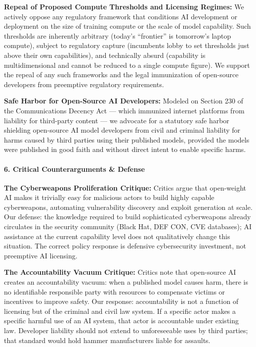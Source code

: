 \textbf{Repeal of Proposed Compute Thresholds and Licensing Regimes:} We
actively oppose any regulatory framework that conditions AI development
or deployment on the size of training compute or the scale of model
capability. Such thresholds are inherently arbitrary (today's
``frontier'' is tomorrow's laptop compute), subject to regulatory
capture (incumbents lobby to set thresholds just above their own
capabilities), and technically absurd (capability is multidimensional
and cannot be reduced to a single compute figure). We support the repeal
of any such frameworks and the legal immunization of open-source
developers from preemptive regulatory requirements.

\textbf{Safe Harbor for Open-Source AI Developers:} Modeled on Section
230 of the Communications Decency Act --- which immunized internet
platforms from liability for third-party content --- we advocate for a
statutory safe harbor shielding open-source AI model developers from
civil and criminal liability for harms caused by third parties using
their published models, provided the models were published in good faith
and without direct intent to enable specific harms.

\paragraph{6. Critical Counterarguments \&
Defense}\label{critical-counterarguments-defense-12}

\textbf{The Cyberweapons Proliferation Critique:} Critics argue that
open-weight AI makes it trivially easy for malicious actors to build
highly capable cyberweapons, automating vulnerability discovery and
exploit generation at scale. Our defense: the knowledge required to
build sophisticated cyberweapons already circulates in the security
community (Black Hat, DEF CON, CVE databases); AI assistance at the
current capability level does not qualitatively change this situation.
The correct policy response is defensive cybersecurity investment, not
preemptive AI licensing.

\textbf{The Accountability Vacuum Critique:} Critics note that
open-source AI creates an accountability vacuum: when a published model
causes harm, there is no identifiable responsible party with resources
to compensate victims or incentives to improve safety. Our response:
accountability is not a function of licensing but of the criminal and
civil law system. If a specific actor makes a specific harmful use of an
AI system, that actor is accountable under existing law. Developer
liability should not extend to unforeseeable uses by third parties; that
standard would hold hammer manufacturers liable for assaults.

